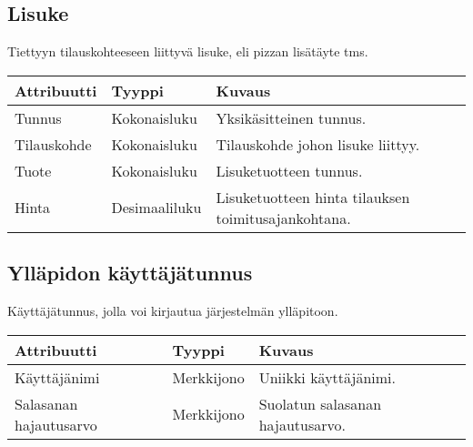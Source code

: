 \documentclass[a4paper, 12pt, finnish]{article}
\begin{document}
\subsection*{Lisuke}
Tiettyyn tilauskohteeseen liittyvä lisuke, eli pizzan lisätäyte tms.

\vspace{0.5cm}\hspace{-1cm}
\begin{tabular}{l l p{7cm}}
\textbf{Attribuutti} & \textbf{Tyyppi} & \textbf{Kuvaus} \\
\hline
Tunnus & Kokonaisluku & Yksikäsitteinen tunnus. \\
Tilauskohde & Kokonaisluku & Tilauskohde johon lisuke liittyy. \\
Tuote & Kokonaisluku & Lisuketuotteen tunnus. \\
Hinta & Desimaaliluku & Lisuketuotteen hinta tilauksen toimitusajankohtana. \\
\end{tabular}

\subsection*{Ylläpidon käyttäjätunnus}
Käyttäjätunnus, jolla voi kirjautua järjestelmän ylläpitoon.

\vspace{0.5cm}\hspace{-1cm}
\begin{tabular}{l l p{7cm}}
\textbf{Attribuutti} & \textbf{Tyyppi} & \textbf{Kuvaus} \\
\hline
Käyttäjänimi & Merkkijono & Uniikki käyttäjänimi. \\
Salasanan hajautusarvo & Merkkijono & Suolatun salasanan hajautusarvo. \\
\end{tabular}
\end{document}
